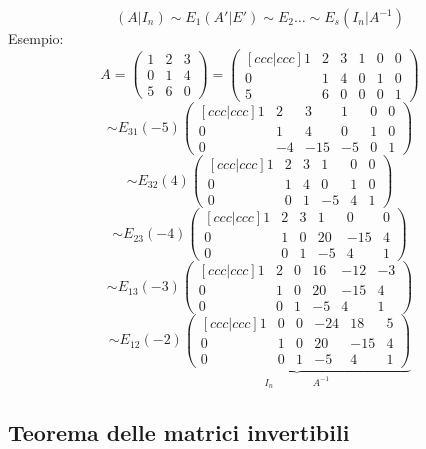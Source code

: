 \documentclass[12pt]{article}
\begin{document}
\[(A|I_n) \sim E_1 (A'|E') \sim E_2 \dots \sim E_s (I_n|A^{-1})\]
Esempio:
\[A = \begin{pmatrix}
    1 & 2 & 3\\
    0 & 1 & 4\\
    5 & 6 & 0
\end{pmatrix} =
\begin{pmatrix}[ccc|ccc]
    1 & 2 & 3 & 1 &0 &0\\
    0 & 1 & 4 & 0 &1 &0\\
    5 & 6 & 0 & 0& 0 &1
\end{pmatrix}
\]
\[\sim E_{31}(-5) \begin{pmatrix}[ccc|ccc]
    1 & 2 & 3 & 1 & 0 &0\\
    0 & 1 & 4 & 0 & 1 &0\\
    0 & -4 & -15 & -5 & 0 & 1
\end{pmatrix}\]
\[\sim E_{32}(4) \begin{pmatrix}[ccc|ccc]
    1 & 2 & 3 & 1 & 0 &0\\
    0 & 1 & 4 & 0 & 1 &0\\
    0 & 0 & 1 & -5 & 4 & 1
\end{pmatrix}\]
\[\sim E_{23}(-4) \begin{pmatrix}[ccc|ccc]
    1 & 2 & 3 & 1 & 0 &0\\
    0 & 1 & 0 & 20 & -15 & 4\\
    0 & 0 & 1 & -5 & 4 & 1
\end{pmatrix}\]
\[\]
\[\sim E_{13}(-3) \begin{pmatrix}[ccc|ccc]
    1 & 2 & 0 & 16 & -12 & -3\\
    0 & 1 & 0 & 20 & -15 & 4\\
    0 & 0 & 1 & -5 & 4 & 1
\end{pmatrix}
\]
\[\sim E_{12}(-2) \underbrace{\begin{pmatrix}[ccc|ccc]
    1 & 0 & 0 & -24 & 18 & 5\\
    0 & 1 & 0 & 20 & -15 & 4\\
    0 & 0 & 1 & -5 & 4 & 1
\end{pmatrix}}_{I_n \quad \quad \quad \quad A^{-1}}\]
\pagebreak
\subsection{Teorema delle matrici invertibili}
\end{document}
